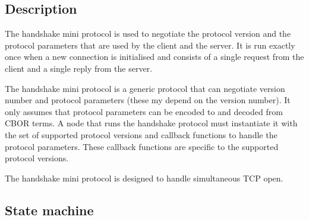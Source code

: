 \newcommand{\StPropose}{\state{StPropose}}
\newcommand{\StConfirm}{\state{StConfirm}}
\newcommand{\MsgProposeVersions}{\msg{MsgProposeVersions}}
\newcommand{\MsgReplyVersions}{\msg{MsgReplyVersion}}
\newcommand{\MsgAcceptVersion}{\msg{MsgAcceptVersion}}
\newcommand{\MsgRefuse}{\msg{MsgRefuse}}

\newcommand{\VersionMismatch}{\msg{VersionMismatch}}
\newcommand{\HandshakeDecodeError}{\msg{HandshakeDecodeError}}
\newcommand{\Refused}{\msg{Refused}}

\subsection{Description}
The handshake mini protocol is used to negotiate the protocol version
and the protocol parameters that are used by the client and the server.
It is run exactly once when a new connection is initialised
and consists of a single request from the client and a single reply from the server.

The handshake mini protocol is a generic protocol that can negotiate version number and protocol parameters (these my depend on the version number).
It only assumes that protocol parameters can be encoded to and decoded from CBOR terms.
A node that runs the handshake protocol must instantiate it with the set of
supported protocol versions and callback functions to handle the protocol parameters.
These callback functions are specific to the supported protocol versions.

The handshake mini protocol is designed to handle simultaneous TCP open.

\subsection{State machine}
\begin{figure}[h]
\end{figure}

